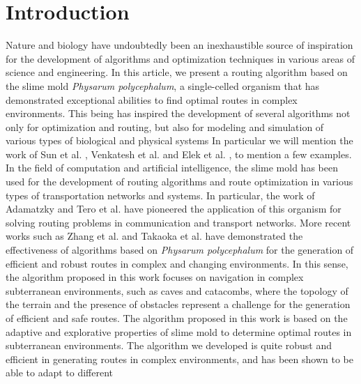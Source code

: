 \documentclass[conference]{IEEEtran}
\begin{document}
\section{Introduction}
\label{sec:introduction}
    Nature and biology have undoubtedly been an inexhaustible source of inspiration for the development of algorithms and optimization 
        techniques in various areas of science and engineering. In this article, we present a routing algorithm based on the 
        slime mold \textit{Physarum polycephalum}, a single-celled organism that has demonstrated exceptional abilities to find 
        optimal routes in complex environments. This being has inspired the development of several algorithms not only for optimization 
        and routing, but also for modeling and simulation of various types of biological and physical systems In particular we will mention
        the work of Sun et al. \cite{Sun2016}, Venkatesh et al. \cite{Venkatesh2020} and Elek et al. \cite{Elek2022}, to mention a few examples.
    \vskip 0.2cm
    In the field of computation and artificial intelligence, the slime mold has been used for the development of 
        routing algorithms and route optimization in various types of transportation networks and systems. 
        In particular, the work of Adamatzky \cite{Adamatzky2010} and Tero et al. \cite{Tero2008}  have pioneered the application of 
        this organism for solving routing problems in communication and transport networks. More recent works such as Zhang et al. 
        \cite{Zhang2023} and Takaoka et al. \cite{Takaoka2019} have demonstrated the effectiveness of algorithms based on \textit{Physarum polycephalum} 
        for the generation of efficient and robust routes in complex and changing environments. In this sense, the algorithm proposed in this work
        focuses on navigation in complex subterranean environments, such as caves and catacombs, where the topology of the terrain and the presence 
        of obstacles represent a challenge for the generation of efficient and safe routes.
    \vskip 0.2cm
    The algorithm proposed in this work is based on the adaptive and explorative properties of slime mold to determine optimal routes in subterranean environments. 
        The algorithm we developed is quite robust and efficient in generating routes in complex environments, and has been shown to be able to adapt to different 
\end{document}
